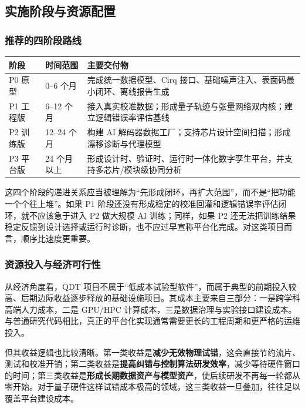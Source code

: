 \documentclass[11pt,a4paper]{article}
\newcommand{\QDT}{QDT}
\begin{document}
\subsection{实施阶段与资源配置}

\subsubsection{推荐的四阶段路线}

\begin{longtable}{L{2.5cm}L{4.2cm}L{6.9cm}}
\toprule
阶段 & 时间范围 & 主要交付物 \\
\midrule
\endhead
P0 原型 & 0--6 个月 & 完成统一数据模型、Cirq 接口、基础噪声注入、表面码最小闭环、离线报告生成 \\
P1 工程版 & 6--12 个月 & 接入真实校准数据；形成量子轨迹与张量网络双内核；建立逻辑错误率评估基线 \\
P2 训练版 & 12--24 个月 & 构建 AI 解码器数据工厂；支持芯片设计空间扫描；形成漂移诊断与代理模型 \\
P3 平台版 & 24 个月以上 & 形成设计时、验证时、运行时一体化数字孪生平台，并支持多芯片/模块级协同分析 \\
\bottomrule
\end{longtable}

这四个阶段的递进关系应当被理解为“先形成闭环，再扩大范围”，而不是“把功能一个个往上堆”。如果 P1 阶段还没有形成稳定的校准回灌和逻辑错误率评估闭环，就不应该急于进入 P2 做大规模 AI 训练；同样，如果 P2 还无法把训练结果稳定反馈到设计选择或运行时诊断，也不应过早宣称平台化完成。对这类项目而言，顺序比速度更重要。

\subsubsection{资源投入与经济可行性}

从经济角度看，\QDT{} 项目不属于“低成本试验型软件”，而属于典型的前期投入较高、后期边际收益逐步释放的基础设施项目。其成本主要来自三部分：一是跨学科高端人力成本，二是 GPU/HPC 计算成本，三是数据治理与实验接口建设成本。与普通研究代码相比，真正的平台化实现通常需要更长的工程周期和更严格的运维投入。

但其收益逻辑也比较清晰。第一类收益是\textbf{减少无效物理试错}，这会直接节约流片、测试和校准开销；第二类收益是\textbf{提高纠错与控制算法研发效率}，减少等待硬件窗口的时间；第三类收益是\textbf{形成长期数据资产与模型资产}，使后续研发不再每一轮都从零开始。对于量子硬件这样试错成本极高的领域，这三类收益一旦叠加，往往足以覆盖平台建设成本。
\end{document}
